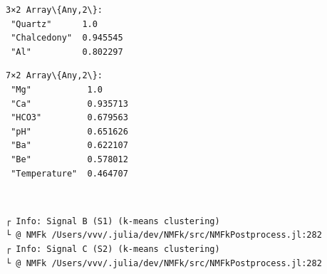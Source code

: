 \documentclass[11pt]{article}
\begin{document}
    
    \begin{Verbatim}[commandchars=\\\{\}]
3×2 Array\{Any,2\}:
 "Quartz"      1.0
 "Chalcedony"  0.945545
 "Al"          0.802297
    \end{Verbatim}

    
    
    \begin{Verbatim}[commandchars=\\\{\}]
7×2 Array\{Any,2\}:
 "Mg"           1.0
 "Ca"           0.935713
 "HCO3"         0.679563
 "pH"           0.651626
 "Ba"           0.622107
 "Be"           0.578012
 "Temperature"  0.464707
    \end{Verbatim}

    
    \begin{center}
    \end{center}
    { \hspace*{\fill} \\}
    
    \begin{Verbatim}[commandchars=\\\{\}]
┌ Info: Signal B (S1) (k-means clustering)
└ @ NMFk /Users/vvv/.julia/dev/NMFk/src/NMFkPostprocess.jl:282
┌ Info: Signal C (S2) (k-means clustering)
└ @ NMFk /Users/vvv/.julia/dev/NMFk/src/NMFkPostprocess.jl:282
    \end{Verbatim}

    \begin{center}
    \end{center}
    { \hspace*{\fill} \\}
    
    \begin{Verbatim}[commandchars=\\\{\}]

    \end{Verbatim}

    \begin{center}
    \end{center}
    { \hspace*{\fill} \\}
    
    \begin{center}
    \end{center}
    { \hspace*{\fill} \\}
    
\end{document}
